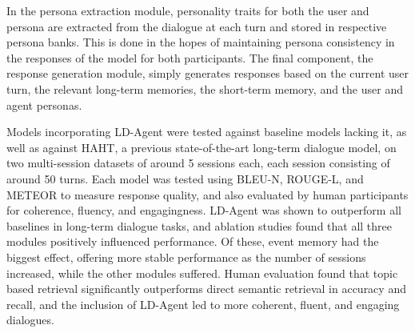 In the persona extraction module, personality traits for both the user and persona are extracted from the dialogue at each turn and stored in respective persona banks. This is done in the hopes of maintaining persona consistency in the responses of the model for both participants. The final component, the response generation module, simply generates responses based on the current user turn, the relevant long-term memories, the short-term memory, and the user and agent personas.

Models incorporating LD-Agent were tested against baseline models lacking it, as well as against HAHT, a previous state-of-the-art long-term dialogue model, on two multi-session datasets of around 5 sessions each, each session consisting of around 50 turns. Each model was tested using BLEU-N, ROUGE-L, and METEOR to measure response quality, and also evaluated by human participants for coherence, fluency, and engagingness. LD-Agent was shown to outperform all baselines in long-term dialogue tasks, and ablation studies found that all three modules positively influenced performance. Of these, event memory had the biggest effect, offering more stable performance as the number of sessions increased, while the other modules suffered. Human evaluation found that topic based retrieval significantly outperforms direct semantic retrieval in accuracy and recall, and the inclusion of LD-Agent led to more coherent, fluent, and engaging dialogues.

